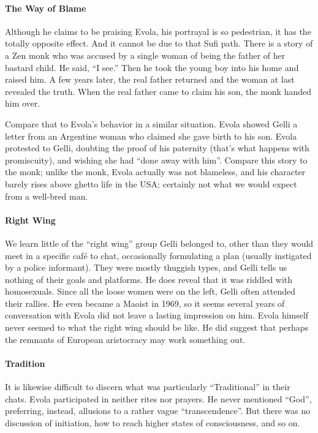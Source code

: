\paragraph{The Way of Blame}


Although he claims to be praising Evola, his portrayal is so pedestrian, it has the totally opposite effect. And it cannot be due to that Sufi path. There is a story of a Zen monk who was accused by a single woman of being the father of her bastard child. He said, ``I see.'' Then he took the young boy into his home and raised him. A few years later, the real father returned and the woman at last revealed the truth. When the real father came to claim his son, the monk handed him over.

Compare that to Evola's behavior in a similar situation. Evola showed Gelli a letter from an Argentine woman who claimed she gave birth to his son. Evola protested to Gelli, doubting the proof of his paternity (that's what happens with promiscuity), and wishing she had ``done away with him''. Compare this story to the monk; unlike the monk, Evola actually was not blameless, and his character barely rises above ghetto life in the USA; certainly not what we would expect from a well-bred man.

\paragraph{Right Wing}


We learn little of the ``right wing'' group Gelli belonged to, other than they would meet in a specific café to chat, occasionally formulating a plan (usually instigated by a police informant). They were mostly thuggish types, and Gelli tells us nothing of their goals and platforms. He does reveal that it was riddled with homosexuals. Since all the loose women were on the left, Gelli often attended their rallies. He even became a Maoist in 1969, so it seems several years of conversation with Evola did not leave a lasting impression on him. Evola himself never seemed to what the right wing should be like. He did suggest that perhaps the remnants of European aristocracy may work something out.

\paragraph{Tradition}


It is likewise difficult to discern what was particularly ``Traditional'' in their chats. Evola participated in neither rites nor prayers. He never mentioned ``God'', preferring, instead, allusions to a rather vague ``transcendence''. But there was no discussion of initiation, how to reach higher states of consciousness, and so on.

